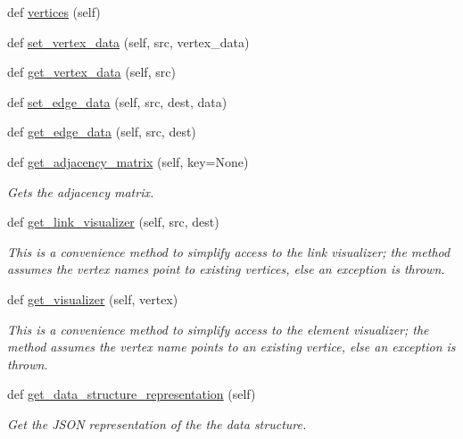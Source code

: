 \begin{DoxyCompactItemize}
def \hyperlink{classbridges_1_1graph__adj__matrix_1_1_graph_adj_matrix_a2f7f0fe4ba172afeb1dcb1afc1f6bf31}{vertices} (self)
\item 
def \hyperlink{classbridges_1_1graph__adj__matrix_1_1_graph_adj_matrix_a96d735f98243acee1a604ed9dc990356}{set\+\_\+vertex\+\_\+data} (self, src, vertex\+\_\+data)
\item 
def \hyperlink{classbridges_1_1graph__adj__matrix_1_1_graph_adj_matrix_a6ae3c6fbe98c554ba976ef095a77871b}{get\+\_\+vertex\+\_\+data} (self, src)
\item 
def \hyperlink{classbridges_1_1graph__adj__matrix_1_1_graph_adj_matrix_ac456de9923ee8d671d1b6d908568b1bc}{set\+\_\+edge\+\_\+data} (self, src, dest, data)
\item 
def \hyperlink{classbridges_1_1graph__adj__matrix_1_1_graph_adj_matrix_aa3b7bc3f06d00e9a67f8d1cf6793ad70}{get\+\_\+edge\+\_\+data} (self, src, dest)
\item 
def \hyperlink{classbridges_1_1graph__adj__matrix_1_1_graph_adj_matrix_aa64d4ed1525c6b4959269df0e4090e01}{get\+\_\+adjacency\+\_\+matrix} (self, key=None)
\begin{DoxyCompactList}\small\item\em Gets the adjacency matrix. \end{DoxyCompactList}\item 
def \hyperlink{classbridges_1_1graph__adj__matrix_1_1_graph_adj_matrix_a7071cdb99fdd2afd558d19f1470b8c9f}{get\+\_\+link\+\_\+visualizer} (self, src, dest)
\begin{DoxyCompactList}\small\item\em This is a convenience method to simplify access to the link visualizer; the method assumes the vertex names point to existing vertices, else an exception is thrown. \end{DoxyCompactList}\item 
def \hyperlink{classbridges_1_1graph__adj__matrix_1_1_graph_adj_matrix_a96177ddfba9e474543b03d58fbc37e40}{get\+\_\+visualizer} (self, vertex)
\begin{DoxyCompactList}\small\item\em This is a convenience method to simplify access to the element visualizer; the method assumes the vertex name points to an existing vertice, else an exception is thrown. \end{DoxyCompactList}\item 
def \hyperlink{classbridges_1_1graph__adj__matrix_1_1_graph_adj_matrix_a9e8f53fc0dcd724bb29502fe08ea837e}{get\+\_\+data\+\_\+structure\+\_\+representation} (self)
\begin{DoxyCompactList}\small\item\em Get the J\+S\+ON representation of the the data structure. \end{DoxyCompactList}\end{DoxyCompactItemize}


